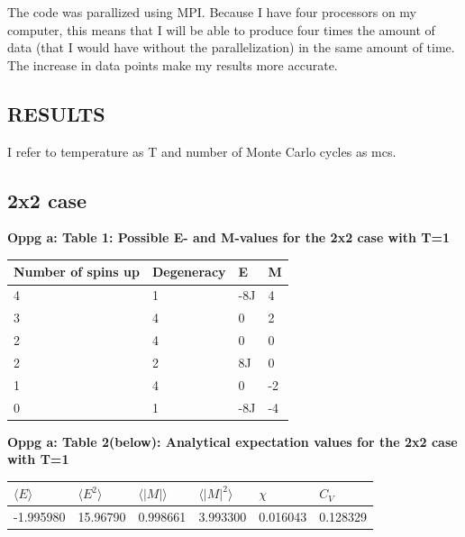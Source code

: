\documentclass[twocolumn]{article}
\begin{document}
The code was parallized using MPI. Because I have four processors on my computer, this means that I will be able to produce four times the amount of data (that I would have without the parallelization) in the same amount of time. The increase in data points make my results more accurate.
\newpage
\onecolumngrid
\begin{center}
\section{RESULTS}
\end{center}
I refer to temperature as T and number of Monte Carlo cycles as mcs.\newline

\centering\subsection{2x2 case}

\begin{center}
\textbf{Oppg a: Table 1: Possible E- and M-values for the 2x2 case with T=1}
\newline
\bigskip
\resizebox{3cm} {
\centering\begin{tabular}{|| l | l | l | l ||}
    \hline
    Number of spins up & Degeneracy & E & M\\
    \hline 
    4 & 1 & -8J & 4 \\
    \hline
    3 & 4 & 0 & 2 \\
    \hline
    2 & 4 & 0 & 0 \\
    \hline
    2 & 2 & 8J & 0 \\
    \hline
    1 & 4 & 0 & -2\\
    \hline
    0 & 1 & -8J & -4 \\
    \hline
\end{tabular}
}\newline
\end{center}

\textbf{Oppg a: Table 2(below): Analytical expectation values for the 2x2 case with T=1}
\newline
\centering
\bigskip
\resizebox{3cm} {
\begin{tabular}{|| l | l | l | l | l | l ||}
    \hline
    $\langle E \rangle$ & $\langle E^2 \rangle$ & $\langle |M| \rangle$ & $\langle |M|^2 \rangle$ & $\chi$ & $C_V$\\
    \hline 
    -1.995980 & 15.96790 & 0.998661 & 3.993300 & 0.016043 & 0.128329 \\
    \hline
\end{tabular}
}
\end{document}
